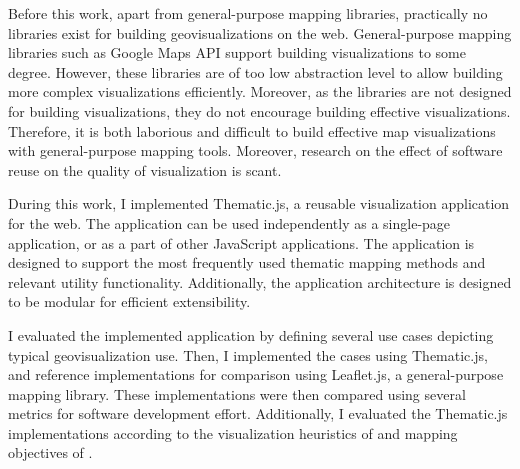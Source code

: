 
Before this work, apart from general-purpose mapping libraries, practically no libraries exist for building geovisualizations on the web. General-purpose mapping libraries such as Google Maps API support building visualizations to some degree. However, these libraries are of too low abstraction level to allow building more complex visualizations efficiently. Moreover, as the libraries are not designed for building visualizations, they do not encourage building effective visualizations. Therefore, it is both laborious and difficult to build effective map visualizations with general-purpose mapping tools. Moreover, research on the effect of software reuse on the quality of visualization is scant.

During this work, I implemented Thematic.js, a reusable visualization application for the web. The application can be used independently as a single-page application, or as a part of other JavaScript applications. The application is designed to support the most frequently used thematic mapping methods and relevant utility functionality. Additionally, the application architecture is designed to be modular for efficient extensibility.

I evaluated the implemented application by defining several use cases depicting typical geovisualization use. Then, I implemented the cases using Thematic.js, and reference implementations for comparison using Leaflet.js, a general-purpose mapping library. These implementations were then compared using several metrics for software development effort. Additionally, I evaluated the Thematic.js implementations according to the visualization heuristics of \citet{zuk_heuristics_2006} and mapping objectives of \citet{schlichtmann_visualization_2002}.

